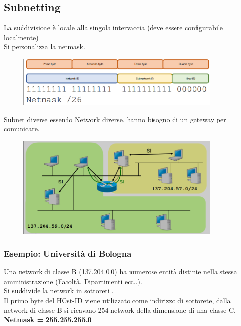 \documentclass{report}
\begin{document}
            \subsection{Subnetting}
                La suddivisione è locale alla singola intervaccia (deve essere configurabile localmente)
                \\
                Si personalizza la netmask.
                 \begin{figure}[H]
                    \includegraphics[width=0.9\textwidth]{1/sub1.png}
                \end{figure}
                Subnet diverse essendo Network diverse, hanno bisogno di un gateway per comunicare.
                \begin{figure}[H]
                    \includegraphics[width=0.9\textwidth]{1/sub2.png}
                \end{figure}
                \subsubsection{Esempio: Università di Bologna}
                    Una network di classe B (137.204.0.0) ha numerose entità distinte nella stessa amministrazione (Facoltà, Dipartimenti ecc..). 
                    \\
                    Si suddivide la network in sottoreti .
                    \\
                    Il primo byte del HOst-ID viene utilizzato come indirizzo di sottorete, dalla network di classe B si ricavano 254 network della dimensione di una classe C,\textbf{ Netmask = 255.255.255.0}
\end{document}
